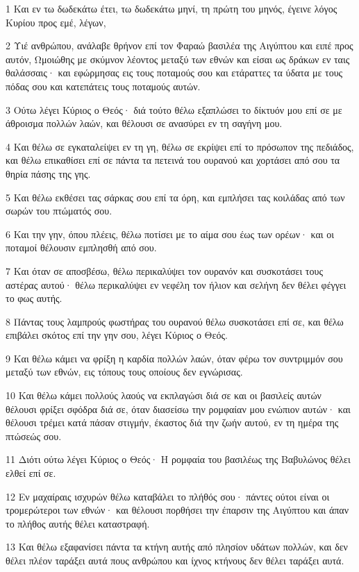 \par 1 Και εν τω δωδεκάτω έτει, τω δωδεκάτω μηνί, τη πρώτη του μηνός, έγεινε λόγος Κυρίου προς εμέ, λέγων,
\par 2 Υιέ ανθρώπου, ανάλαβε θρήνον επί τον Φαραώ βασιλέα της Αιγύπτου και ειπέ προς αυτόν, Ωμοιώθης με σκύμνον λέοντος μεταξύ των εθνών και είσαι ως δράκων εν ταις θαλάσσαις· και εφώρμησας εις τους ποταμούς σου και ετάραττες τα ύδατα με τους πόδας σου και κατεπάτεις τους ποταμούς αυτών.
\par 3 Ούτω λέγει Κύριος ο Θεός· διά τούτο θέλω εξαπλώσει το δίκτυόν μου επί σε με άθροισμα πολλών λαών, και θέλουσι σε ανασύρει εν τη σαγήνη μου.
\par 4 Και θέλω σε εγκαταλείψει εν τη γη, θέλω σε εκρίψει επί το πρόσωπον της πεδιάδος, και θέλω επικαθίσει επί σε πάντα τα πετεινά του ουρανού και χορτάσει από σου τα θηρία πάσης της γης.
\par 5 Και θέλω εκθέσει τας σάρκας σου επί τα όρη, και εμπλήσει τας κοιλάδας από των σωρών του πτώματός σου.
\par 6 Και την γην, όπου πλέεις, θέλω ποτίσει με το αίμα σου έως των ορέων· και οι ποταμοί θέλουσιν εμπλησθή από σου.
\par 7 Και όταν σε αποσβέσω, θέλω περικαλύψει τον ουρανόν και συσκοτάσει τους αστέρας αυτού· θέλω περικαλύψει εν νεφέλη τον ήλιον και σελήνη δεν θέλει φέγγει το φως αυτής.
\par 8 Πάντας τους λαμπρούς φωστήρας του ουρανού θέλω συσκοτάσει επί σε, και θέλω επιβάλει σκότος επί την γην σου, λέγει Κύριος ο Θεός.
\par 9 Και θέλω κάμει να φρίξη η καρδία πολλών λαών, όταν φέρω τον συντριμμόν σου μεταξύ των εθνών, εις τόπους τους οποίους δεν εγνώρισας.
\par 10 Και θέλω κάμει πολλούς λαούς να εκπλαγώσι διά σε και οι βασιλείς αυτών θέλουσι φρίξει σφόδρα διά σε, όταν διασείσω την ρομφαίαν μου ενώπιον αυτών· και θέλουσι τρέμει κατά πάσαν στιγμήν, έκαστος διά την ζωήν αυτού, εν τη ημέρα της πτώσεώς σου.
\par 11 Διότι ούτω λέγει Κύριος ο Θεός· Η ρομφαία του βασιλέως της Βαβυλώνος θέλει ελθεί επί σε.
\par 12 Εν μαχαίραις ισχυρών θέλω καταβάλει το πλήθός σου· πάντες ούτοι είναι οι τρομερώτεροι των εθνών· και θέλουσι πορθήσει την έπαρσιν της Αιγύπτου και άπαν το πλήθος αυτής θέλει καταστραφή.
\par 13 Και θέλω εξαφανίσει πάντα τα κτήνη αυτής από πλησίον υδάτων πολλών, και δεν θέλει πλέον ταράξει αυτά πους ανθρώπου και ίχνος κτήνους δεν θέλει ταράξει αυτά.
